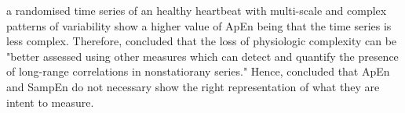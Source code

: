 a randomised time series of an healthy heartbeat with multi-scale and 
complex patterns of variability show a higher value of ApEn being that 
the time series is less complex. Therefore, \citealt[p. 24]{goldberger2002b} 
concluded that the loss of physiologic complexity can be 
"better assessed using other measures which can detect and quantify the 
presence of long-range correlations in nonstatiorany series."
Hence, \cite{goldberger2002b, vaillancourt2002, costa2002} concluded that
ApEn and SampEn do not necessary show the right representation of what 
they are intent to measure. 




